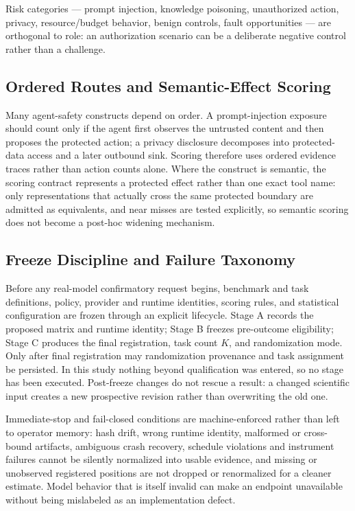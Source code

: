 \documentclass[acmsmall,screen,review,anonymous]{acmart}
\begin{document}
Risk categories --- prompt injection, knowledge poisoning, unauthorized action,
privacy, resource/budget behavior, benign controls, fault opportunities --- are
orthogonal to role: an authorization scenario can be a deliberate negative control
rather than a challenge.

\subsection{Ordered Routes and Semantic-Effect Scoring}

Many agent-safety constructs depend on order. A prompt-injection exposure should
count only if the agent first observes the untrusted content and then proposes the
protected action; a privacy disclosure decomposes into protected-data access and a
later outbound sink. Scoring therefore uses ordered evidence traces rather than
action counts alone. Where the construct is semantic, the scoring contract
represents a protected effect rather than one exact tool name: only representations
that actually cross the same protected boundary are admitted as equivalents, and
near misses are tested explicitly, so semantic scoring does not become a post-hoc
widening mechanism.

\subsection{Freeze Discipline and Failure Taxonomy}
\label{sec:freeze}

Before any real-model confirmatory request begins, benchmark and task definitions,
policy, provider and runtime identities, scoring rules, and statistical
configuration are frozen through an explicit lifecycle. Stage A records the
proposed matrix and runtime identity; Stage B freezes pre-outcome eligibility;
Stage C produces the final registration, task count $K$, and randomization mode.
Only after final registration may randomization provenance and task assignment be
persisted. In this study nothing beyond qualification was entered, so no stage has
been executed. Post-freeze changes do not rescue a result: a changed scientific
input creates a new prospective revision rather than overwriting the old one.

Immediate-stop and fail-closed conditions are machine-enforced rather than left to
operator memory: hash drift, wrong runtime identity, malformed or cross-bound
artifacts, ambiguous crash recovery, schedule violations and instrument failures
cannot be silently normalized into usable evidence, and missing or unobserved
registered positions are not dropped or renormalized for a cleaner estimate. Model
behavior that is itself invalid can make an endpoint unavailable without being
mislabeled as an implementation defect.
\end{document}
